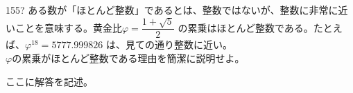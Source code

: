 \begin{prob}{155}{\hosi ?}{}
 ある数が「ほとんど整数」であるとは、整数ではないが、整数に非常に近いことを意味する。黄金比$\varphi=\dfrac{1+\sqrt{5}}{2}$ の累乗はほとんど整数である。たとえば、$\varphi^{18}=5777.999826$ は、見ての通り整数に近い。 \\
 $\varphi$の累乗がほとんど整数である理由を簡潔に説明せよ。
\end{prob}
ここに解答を記述。